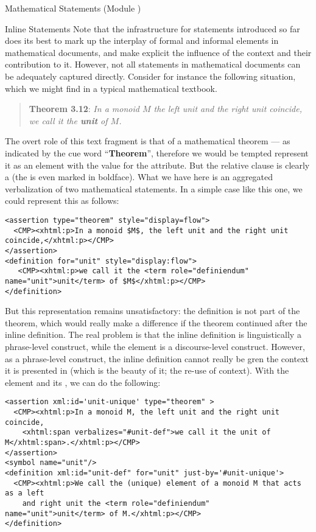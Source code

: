 \begin{tchapter}[id=statements,short=Mathematical Statements]{Mathematical Statements (Module {})}
\begin{tsection}[id=inline-statements]{Inline Statements}
  Note that the infrastructure for statements introduced so far does its best to mark up
  the interplay of formal and informal elements in mathematical documents, and make
  explicit the influence of the context and their contribution to it. However, not all
  statements in mathematical documents can be adequately captured directly.  Consider for
  instance the following situation, which we might find in a typical mathematical
  textbook.
\begin{quote}
  {\bf{Theorem 3.12}}: {\emph{In a monoid $M$ the left unit and the right unit coincide,
      we call it the {\bf{unit}} of $M$.}}
\end{quote}
The overt role of this text fragment is that of a mathematical theorem --- as indicated by
the cue word ``{\bf{Theorem}}'', therefore we would be tempted represent it as an
{} element with the value {} for the
{} attribute. But the relative clause is clearly a
{} (the {} is even marked in boldface). What we
have here is an aggregated verbalization of two mathematical statements. In a simple case
like this one, we could represent this as follows:

\begin{lstlisting}[mathescape,caption=A Simple-Minded Representation of {\bf{Theorem 3.12}}]
<assertion type="theorem" style="display=flow">
  <CMP><xhtml:p>In a monoid $M$, the left unit and the right unit coincide,</xhtml:p></CMP>
</assertion>
<definition for="unit" style="display:flow">
   <CMP><xhtml:p>we call it the <term role="definiendum" name="unit">unit</term> of $M$</xhtml:p></CMP>
</definition>
\end{lstlisting}

But this representation remains unsatisfactory: the definition is not part of the theorem,
which would really make a difference if the theorem continued after the inline
definition. The real problem is that the inline definition is linguistically a
phrase-level construct, while the {} element is a discourse-level
construct. However, as a phrase-level construct, the inline definition cannot really be
gren the context it is presented in (which is the
beauty of it; the re-use of context). With the {} element and its
, we can do the following:

\begin{lstlisting}[mathescape,caption=An Inline Definition]
<assertion xml:id='unit-unique' type="theorem" >
  <CMP><xhtml:p>In a monoid M, the left unit and the right unit coincide,
    <xhtml:span verbalizes="#unit-def">we call it the unit of M</xhtml:span>.</xhtml:p></CMP>
</assertion>
<symbol name="unit"/>
<definition xml:id="unit-def" for="unit" just-by='#unit-unique'>
  <CMP><xhtml:p>We call the (unique) element of a monoid M that acts as a left 
    and right unit the <term role="definiendum" name="unit">unit</term> of M.</xhtml:p></CMP>
</definition>
\end{lstlisting}


\end{tsection}
\end{tchapter}
